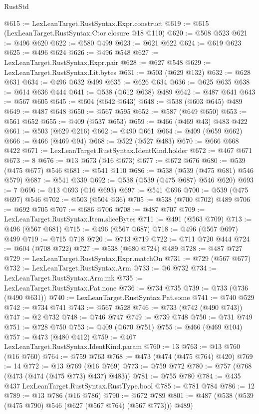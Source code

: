 \begin{lexlean}{RustStd}
\begin{coremodule}
@615 := LexLeanTarget.RustSyntax.Expr.construct
@619 := @615 (LexLeanTarget.RustSyntax.Ctor.closure @18 @110)
@620 := @508 @523
@621 := @496 @620
@622 := @580 @499
@623 := @621 @622
@624 := @619 @623
@625 := @496 @624
@626 := @496 @548
@627 := LexLeanTarget.RustSyntax.Expr.pair
@628 := @627 @548
@629 := LexLeanTarget.RustSyntax.Lit.bytes
@631 := @503 (@629 @132)
@632 := @628 @631
@634 := @496 @632 @499
@635 := @626 @634
@636 := @625 @635
@638 := @614 @636 @444
@641 := @538 (@612 @638) @489
@642 := @487 @641
@643 := @567 @605
@645 := @604 (@642 @643)
@648 := @538 (@603 @645) @489
@649 := @487 @648
@650 := @567 @595
@652 := @587 (@649 @650)
@653 := @561 @652
@655 := @409 (@537 @653)
@659 := @466 (@469 @43) @483 @422
@661 := @503 (@629 @216)
@662 := @490 @661
@664 := @409 (@659 @662)
@666 := @466 (@469 @94)
@668 := @522 (@527 @483)
@670 := @666 @668 @422
@671 := LexLeanTarget.RustSyntax.IdentKind.holder
@672 := @467 @671
@673 := 8
@676 := @13 @673 (@16 @673)
@677 := @672 @676
@680 := @539 (@475 @677) @546
@681 := @541 @110
@686 := @538 (@539 (@475 @681) @546 @579)
@687 := @541 @339
@692 := @538 (@539 (@475 @687) @546 @620)
@693 := 7
@696 := @13 @693 (@16 @693)
@697 := @541 @696
@700 := @539 (@475 @697) @546
@702 := @503 (@504 @36)
@705 := @538 (@700 @702) @489
@706 := @692 @705
@707 := @686 @706
@708 := @487 @707
@709 := LexLeanTarget.RustSyntax.Item.sliceBytes
@711 := @491 (@563 @709)
@713 := @496 (@567 @681)
@715 := @496 (@567 @687)
@718 := @496 (@567 @697) @499
@719 := @715 @718
@720 := @713 @719
@722 := @711 @720 @444
@724 := @604 (@708 @722)
@727 := @538 (@680 @724) @489
@728 := @487 @727
@729 := LexLeanTarget.RustSyntax.Expr.matchOn
@731 := @729 (@567 @677)
@732 := LexLeanTarget.RustSyntax.Arm
@733 := @6 @732
@734 := LexLeanTarget.RustSyntax.Arm.mk
@735 := LexLeanTarget.RustSyntax.Pat.none
@736 := @734 @735
@739 := @733 (@736 (@490 @631))
@740 := LexLeanTarget.RustSyntax.Pat.some
@741 := @740 @529
@742 := @734 @741
@743 := @567 @528
@746 := @733 (@742 (@490 @743))
@747 := @2 @732
@748 := @746 @747
@749 := @739 @748
@750 := @731 @749
@751 := @728 @750
@753 := @409 (@670 @751)
@755 := @466 (@469 @104)
@757 := @473 (@480 @412)
@759 := @467 LexLeanTarget.RustSyntax.IdentKind.param
@760 := 13
@763 := @13 @760 (@16 @760)
@764 := @759 @763
@768 := @473 (@474 (@475 @764) @420)
@769 := 14
@772 := @13 @769 (@16 @769)
@773 := @759 @772
@780 := @757 (@768 (@473 (@474 (@475 @773) @437) @483))
@781 := @755 @780
@784 := @435 @437 LexLeanTarget.RustSyntax.RustType.bool
@785 := @781 @784
@786 := 12
@789 := @13 @786 (@16 @786)
@790 := @672 @789
@801 := @487 (@538 (@539 (@475 @790) @546 (@627 (@567 @764) (@567 @773))) @489)

\end{coremodule}
\end{lexlean}
